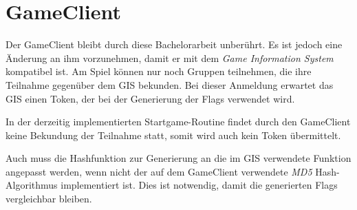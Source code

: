 \section{GameClient} \label{sec:GameClient}
Der GameClient bleibt durch diese Bachelorarbeit unberührt. Es ist jedoch eine Änderung an ihm vorzunehmen, damit er mit dem \textit{Game Information System} kompatibel ist.
Am Spiel können nur noch Gruppen teilnehmen, die ihre Teilnahme gegenüber dem GIS bekunden. Bei dieser Anmeldung erwartet das GIS einen Token, der bei der Generierung der Flags verwendet wird. 

In der derzeitig implementierten Startgame-Routine findet durch den GameClient keine \linebreak Bekundung der Teilnahme statt, somit wird auch kein Token übermittelt.

Auch muss die Hashfunktion zur Generierung an die im GIS verwendete Funktion angepasst werden, wenn nicht der auf dem GameClient verwendete \textit{MD5} Hash-Algorithmus implementiert ist. Dies ist notwendig, damit die generierten Flags vergleichbar bleiben.